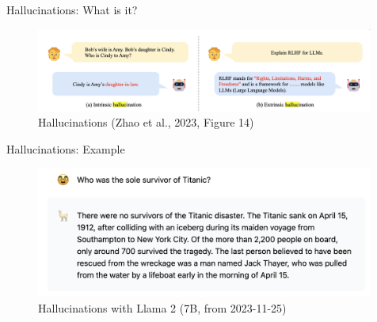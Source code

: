 \documentclass[10pt]{beamer}
\begin{document}
\begin{frame}{Hallucinations: What is it?}

\begin{figure}[h]
\centering
\includegraphics[width=0.99\textwidth]{fig/zhou_2023_fig14}
\caption{Hallucinations (Zhao et al., 2023, Figure 14)}
\end{figure}


\end{frame}






\begin{frame}{Hallucinations: Example}

\begin{figure}[h]
\centering
\includegraphics[width=0.99\textwidth]{fig/hall_llama7B}
\caption{Hallucinations with Llama 2 (7B, from 2023-11-25)}
\end{figure}

\end{frame}
\end{document}
